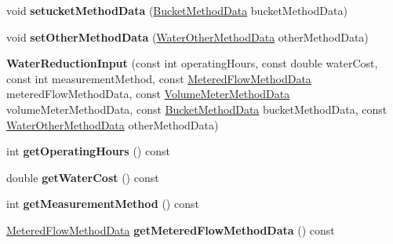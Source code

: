 \begin{DoxyCompactItemize}
\item 
\mbox{\label{class_water_reduction_input_a17a480f7b3f54a14c4dbbca956faba08}} 
void {\bfseries setucket\+Method\+Data} (\hyperlink{class_bucket_method_data}{Bucket\+Method\+Data} bucket\+Method\+Data)
\item 
\mbox{\label{class_water_reduction_input_aa5fdd9f96fdc7f92f657d3fa2157aa78}} 
void {\bfseries set\+Other\+Method\+Data} (\hyperlink{class_water_other_method_data}{Water\+Other\+Method\+Data} other\+Method\+Data)
\item 
\mbox{\label{class_water_reduction_input_a3dca4a54390c3138ffb370b6f2cb042a}} 
{\bfseries Water\+Reduction\+Input} (const int operating\+Hours, const double water\+Cost, const int measurement\+Method, const \hyperlink{class_metered_flow_method_data}{Metered\+Flow\+Method\+Data} metered\+Flow\+Method\+Data, const \hyperlink{class_volume_meter_method_data}{Volume\+Meter\+Method\+Data} volume\+Meter\+Method\+Data, const \hyperlink{class_bucket_method_data}{Bucket\+Method\+Data} bucket\+Method\+Data, const \hyperlink{class_water_other_method_data}{Water\+Other\+Method\+Data} other\+Method\+Data)
\item 
\mbox{\label{class_water_reduction_input_a5729d714bc997517ddd5c2cb669342bf}} 
int {\bfseries get\+Operating\+Hours} () const
\item 
\mbox{\label{class_water_reduction_input_abc82bf5deda166af87b8c1e4282a8551}} 
double {\bfseries get\+Water\+Cost} () const
\item 
\mbox{\label{class_water_reduction_input_ac35bb3e183348ece8e5b7a4d1fbc9e0f}} 
int {\bfseries get\+Measurement\+Method} () const
\item 
\mbox{\label{class_water_reduction_input_ac60726af81042d3ccab564b4592379f5}} 
\hyperlink{class_metered_flow_method_data}{Metered\+Flow\+Method\+Data} {\bfseries get\+Metered\+Flow\+Method\+Data} () const
\item 
\mbox{\label{class_water_reduction_input_ace98f845b1eea761820edc1d41931528}} 

\end{DoxyCompactItemize}
